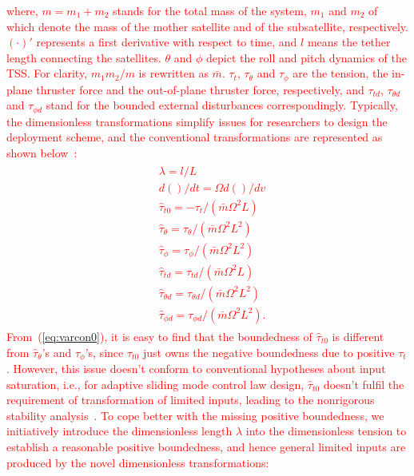 \documentclass[3p]{elsarticle}
\theoremstyle{plain}
\theoremstyle{remark}
\begin{document}
\textcolor{red}{where, $m = m_1+m_2$ stands for the total mass of the system, $m_1$ and $m_2$ of which denote the mass of the mother satellite and of the subsatellite, respectively. \textcolor{red}{$(\cdot)'$ represents a first derivative with respect to time, and $l$ means the tether length connecting the satellites. $\theta$ and $\phi$ depict the roll and pitch dynamics of the TSS. For clarity, $m_1m_2/m$ is rewritten as $\bar m$. $\tau_t$, $\tau_\theta$ and $\tau_\phi$ are the tension, the in-plane thruster force and the out-of-plane thruster force, respectively, and $\tau_{t d}$, $\tau_{\theta d}$ and $\tau_{\phi d}$ stand for the bounded external disturbances correspondingly.} Typically, the dimensionless transformations simplify issues for researchers to design the deployment scheme, and the conventional transformations are represented as shown below~\cite{williams2009yes2,wen2015space,wen2016constrained}:
\begin{align}
\begin{split}
&\lambda=l/L\\
&d()/dt=\Omega d()/dv\\
&\hat{\tau}_{t0}=-\tau_t/(\bar{m}\Omega^2L)\\
&\hat{\tau}_\theta=\tau_\theta/(\bar{m}\Omega^2L^2)\\
&\hat{\tau}_\phi = \tau_\phi/(\bar{m}\Omega^2L^2)\\
&\hat{\tau}_{td}=\tau_{td}/(\bar{m}\Omega^2L)\\
&\hat{\tau}_{\theta d}=\tau_{\theta d}/(\bar{m}\Omega^2L^2)\\
&\hat{\tau}_{\phi d}= \tau_{\phi d}/(\bar{m}\Omega^2L^2)\label{eq:varcon0}.
\end{split}
\end{align}
From~(\ref{eq:varcon0}), it is easy to find that the boundedness of $\hat{\tau}_{t0}$ is different from $\hat{\tau}_\theta$'s and $\hat{\tau}_\phi$'s, since $\hat{\tau}_{t0}$ just owns the negative boundedness due to positive $\tau_t$. However, this issue doesn't conform to conventional hypotheses about input saturation, i.e., for adaptive sliding mode control law design, $\hat{\tau}_{t0}$ doesn't fulfil the requirement of transformation of limited inputs, leading to the nonrigorous stability analysis~\cite{Hu2008552,6060930}. To cope better with the missing positive boundedness, we initiatively introduce the dimensionless length $\lambda$ into the dimensionless tension to establish a reasonable positive boundedness, and hence general limited inputs are produced by the novel dimensionless transformations:
}
\end{document}
